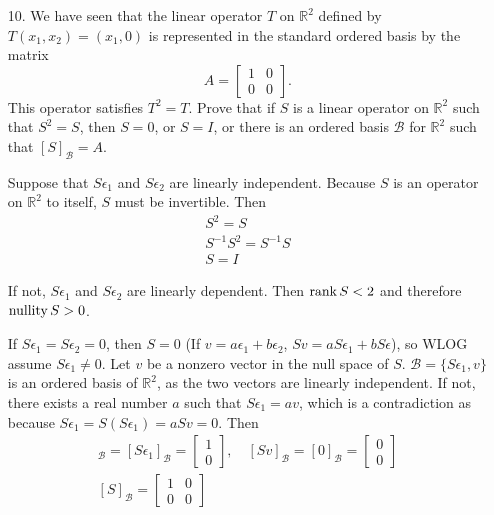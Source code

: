 \documentclass{article}
\begin{document}
\begin{enumerate}[listparindent=\parindent]
\item[10.] We have seen that the linear operator \(T\) on \(\mathbb{R}^2\) defined by \(T(x_1, x_2) = (x_1, 0)\)
    is represented in the standard ordered basis by the matrix
    \[ A = \begin{bmatrix} 1 & 0 \\ 0 & 0 \end{bmatrix}. \]
    This operator satisfies \(T^2 = T\). Prove that if \(S\) is a linear operator on \(\mathbb{R}^2\) such that \(S^2 = S\),
    then \(S = 0\), or \(S = I\), or there is an ordered basis \(\mathcal{B}\) for \(\mathbb{R}^2\) such that \([S]_\mathcal{B} = A\).

    Suppose that \(S\epsilon_1\) and \(S\epsilon_2\) are linearly independent.
    Because \(S\) is an operator on \(\mathbb{R}^2\) to itself, \(S\) must be invertible.
    Then
    \begin{gather*}
        S^2 = S \\
        S^{-1}S^2 = S^{-1}S \\
        S = I
    \end{gather*}

    If not, \(S\epsilon_1\) and \(S\epsilon_2\) are linearly dependent. Then \(\operatorname{rank} S < 2\) and therefore \(\operatorname{nullity} S > 0\).

    If \(S\epsilon_1 = S\epsilon_2 = 0\), then \(S = 0\) (If \(v = a\epsilon_1 + b\epsilon_2\), \(Sv = aS\epsilon_1 + bS\epsilon\)), so WLOG assume \(S\epsilon_1 \neq 0\).
    Let \(v\) be a nonzero vector in the null space of \(S\).
    \(\mathcal{B} = \{S\epsilon_1, v\}\) is an ordered basis of \(\mathbb{R}^2\), as the two vectors are linearly independent.
    If not, there exists a real number \(a\) such that \(S\epsilon_1 = av\), which is a contradiction as because
    \(S\epsilon_1 = S(S\epsilon_1) = aSv = 0\). Then
    \begin{gather*}
        [S(S\epsilon_1)]_\mathcal{B} = [S\epsilon_1]_\mathcal{B} = \begin{bmatrix} 1 \\ 0 \end{bmatrix},\quad
        [Sv]_\mathcal{B} = [0]_\mathcal{B} = \begin{bmatrix} 0 \\ 0 \end{bmatrix} \\
        [S]_\mathcal{B} = \begin{bmatrix} 1 & 0 \\ 0 & 0 \end{bmatrix}
    \end{gather*}
\end{enumerate}
\end{document}
